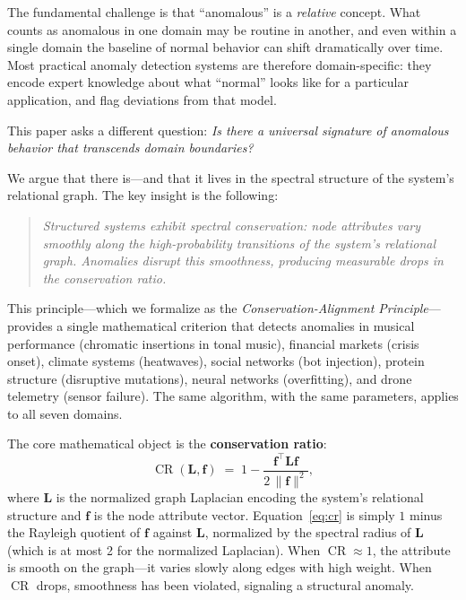\documentclass[11pt,a4paper]{article}
\newcommand{\bff}{\mathbf{f}}
\newcommand{\bL}{\mathbf{L}}
\DeclareMathOperator{\CR}{CR}
\begin{document}
The fundamental challenge is that ``anomalous'' is a \emph{relative} concept.
What counts as anomalous in one domain may be routine in another, and even within
a single domain the baseline of normal behavior can shift dramatically over time.
Most practical anomaly detection systems are therefore domain-specific: they
encode expert knowledge about what ``normal'' looks like for a particular
application, and flag deviations from that model.

This paper asks a different question: \emph{Is there a universal signature of
anomalous behavior that transcends domain boundaries?}

We argue that there is---and that it lives in the spectral structure of the
system's relational graph.  The key insight is the following:

\begin{quote}
\emph{Structured systems exhibit spectral conservation: node attributes vary
smoothly along the high-probability transitions of the system's relational graph.
Anomalies disrupt this smoothness, producing measurable drops in the conservation
ratio.}
\end{quote}

This principle---which we formalize as the \emph{Conservation-Alignment
Principle}---provides a single mathematical criterion that detects anomalies in
musical performance (chromatic insertions in tonal music), financial markets
(crisis onset), climate systems (heatwaves), social networks (bot injection),
protein structure (disruptive mutations), neural networks (overfitting), and
drone telemetry (sensor failure).  The same algorithm, with the same parameters,
applies to all seven domains.

The core mathematical object is the \textbf{conservation ratio}:
\begin{equation}\label{eq:cr}
  \CR(\bL, \bff) \;=\; 1 - \frac{\bff^\top \bL \bff}{2\, \|\bff\|^2},
\end{equation}
where $\bL$ is the normalized graph Laplacian encoding the system's relational
structure and $\bff$ is the node attribute vector.  Equation~\eqref{eq:cr} is
simply $1$ minus the Rayleigh quotient of $\bff$ against $\bL$, normalized by
the spectral radius of $\bL$ (which is at most 2 for the normalized Laplacian).
When $\CR \approx 1$, the attribute is smooth on the graph---it varies slowly
along edges with high weight.  When $\CR$ drops, smoothness has been violated,
signaling a structural anomaly.
\end{document}
